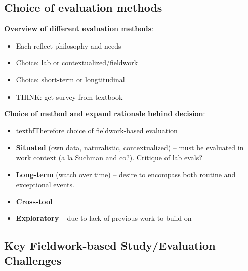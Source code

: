 \subsection{Choice of evaluation methods}

\textbf{Overview of different evaluation methods}:
\begin{itemize}
	\item Each reflect philosophy and needs
	\item Choice: lab or contextualized/fieldwork
	\item Choice: short-term or longtitudinal
	\item THINK: get survey from textbook
\end{itemize}

\textbf{Choice of method and expand rationale behind decision}:
\begin{itemize}
	\item textbf{Therefore choice of fieldwork-based evaluation}
	\item \textbf{Situated} (own data, naturalistic, contextualized) -- must be evaluated in work context (a la Suchman and co?). Critique of lab evals?
	\item \textbf{Long-term} (watch over time) -- desire to encompass both routine and exceptional events.
	\item \textbf{Cross-tool}
	\item \textbf{Exploratory} -- due to lack of previous work to build on
\end{itemize}


		

\subsection{Key Fieldwork-based Study/Evaluation Challenges}

